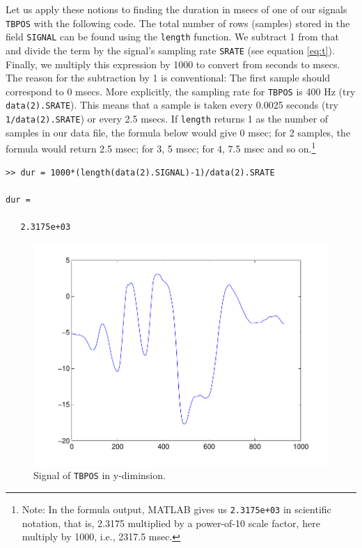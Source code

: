 \documentclass[a4paper, 12pt]{article}
\begin{document}
Let us apply these notions to finding the duration in msecs of one of our signals \texttt{TBPOS} with the following code. The total number of rows (samples) stored in the field \texttt{SIGNAL} can be found using the \texttt{length} function. We subtract 1 from that and divide the term by the signal's sampling rate \texttt{SRATE} (see equation \eqref{eq:t}). Finally, we multiply this expression by 1000 to convert from seconds to msecs. The reason for the subtraction by 1 is conventional: The first sample should correspond to 0 msecs. More explicitly, the sampling rate for \texttt{TBPOS} is 400 Hz (try \texttt{data(2).SRATE}). This means that a sample is taken every 0.0025 seconds (try \texttt{1/data(2).SRATE}) or every 2.5 msecs.  If \texttt{length} returns 1 as the number of samples in our data file, the formula below would give 0 msec; for 2 samples, the formula would return 2.5 msec; for 3, 5 msec; for 4, 7.5 msec and so on.\footnote{Note: In the formula output, MATLAB gives us \texttt{2.3175e+03} in scientific notation, that is, 2.3175 multiplied by a power-of-10 scale factor, here multiply by 1000, i.e., 2317.5 msec.}


\begin{verbatim}
>> dur = 1000*(length(data(2).SIGNAL)-1)/data(2).SRATE

dur =

   2.3175e+03
\end{verbatim}

\setlength\intextsep{-10pt}
\begin{figure}
\includegraphics[scale=0.45]{TBPOS.pdf}%
\caption{Signal of \texttt{TBPOS} in y-diminsion.}\label{fig:tbpos}
\end{figure}
               
\end{document}
